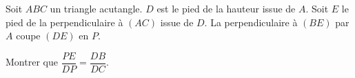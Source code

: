 Soit $ABC$ un triangle acutangle. $D$ est le pied de la hauteur issue de $A$. Soit $E$ le pied de la perpendiculaire à $(AC)$ issue de $D$. La perpendiculaire à $(BE)$ par $A$ coupe $(DE)$ en $P$.

Montrer que $\dfrac{PE}{DP}=\dfrac{DB}{DC}$.